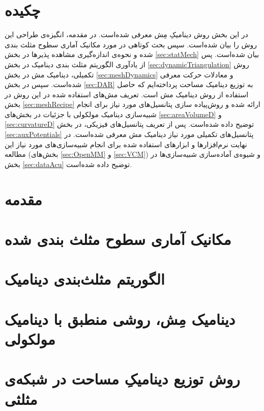 \setRL
\clearpage
\def \MemMethod {\Mempath /MembraneMethod}

\section{
چکیده
}
در این بخش روش  دینامیکِ مِش  معرفی شده‌است. در مقدمه، انگیزه‌ی طراحی این روش را بیان شده‌است. سپس بحث کوتاهی در مورد مکانیک آماری سطوح مثلث بندی شده و نحوه‌ی اندازه‌گیری مشاهده پذیر‌ها در بخش 
\ref{sec:statMech}
بیان شده‌است. پس از یادآوری الگوریتم مثلث بندی دینامیک در بخش
\ref{sec:dynamicTriangulation}
 روش تکمیلی، دینامیک مش در بخش
 \ref{sec:meshDynamics}
و معادلات حرکت معرفی شده‌است. سپس در بخش
 \ref{sec:DAR}
به توزیع دینامیک مساحت پرداخته‌ایم که حاصل استفاده از روش دینامیک مش است. ‌تعریف مش‌های استفاده شده در این روش در بخش
\ref{sec:meshRecipe}
ارائه شده و روش‌پیاده سازی پتانسیل‌های مورد نیاز برای انجام شبیه‌سازی دینامیک مولکولی با جزئیات در بخش‌های
\ref{sec:areaVolumeD}
و
\ref{sec:curvatureD}
توضیح داده شده‌است. پس از تعریف پتانسیل‌های فیزیکی، در بخش
\ref{sec:auxPotentials}
پتانسیل‌های تکمیلی مورد نیاز دینامیک مش معرفی شده‌است. در نهایت نرم‌افزار‌ها و ابزارهای استفاده شده برای انجام شبیه‌سازی‌های مورد نیاز این مطالعه (بخش‌های
\ref{sec:OpenMM}
و
\ref{sec:VCM})
و شیوه‌ی آماده‌سازی شبیه‌سازی‌ها در بخش
\ref{sec:dataAcu}
توضیح داده شده‌است.

\section{
مقدمه
}



\section{\label{sec:statMech}
مکانیک آماری سطوح مثلث بندی شده
}


\section{\label{sec:dynamicTriangulation}
الگوریتم مثلث‌بندی دینامیک
}


\section{\label{sec:meshDynamics}
دینامیک مِش، روشی منطبق با دینامیک مولکولی
}




\section{\label{sec:DAR}
روش توزیع دینامیکِ مساحت در شبکه‌ی مثلثی
}


